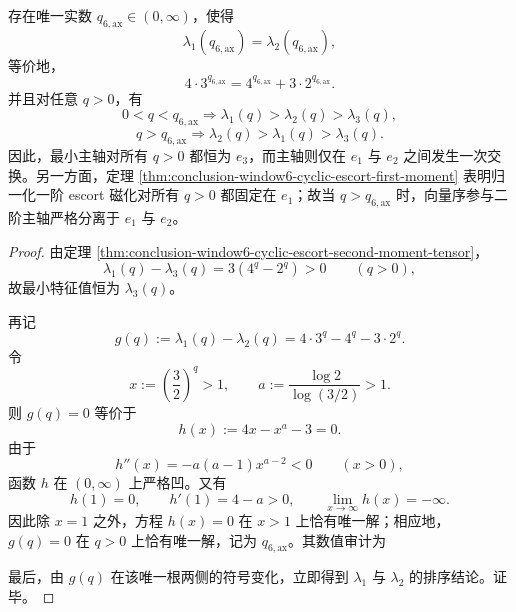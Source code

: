 \begin{corollary}\label{cor:conclusion-window6-cyclic-escort-axis-reordering}
存在唯一实数 \(q_{6,\mathrm{ax}}\in(0,\infty)\)，使得
\[
\lambda_1(q_{6,\mathrm{ax}})=\lambda_2(q_{6,\mathrm{ax}}),
\]
等价地，
\[
4\cdot 3^{q_{6,\mathrm{ax}}}=4^{q_{6,\mathrm{ax}}}+3\cdot 2^{q_{6,\mathrm{ax}}}.
\]
并且对任意 \(q>0\)，有
\[
0<q<q_{6,\mathrm{ax}}
\Longrightarrow
\lambda_1(q)>\lambda_2(q)>\lambda_3(q),
\]
\[
q>q_{6,\mathrm{ax}}
\Longrightarrow
\lambda_2(q)>\lambda_1(q)>\lambda_3(q).
\]
因此，最小主轴对所有 \(q>0\) 都恒为 \(e_3\)，而主轴则仅在 \(e_1\) 与 \(e_2\) 之间发生一次交换。另一方面，定理 \ref{thm:conclusion-window6-cyclic-escort-first-moment} 表明归一化一阶 escort 磁化对所有 \(q>0\) 都固定在 \(e_1\)；故当 \(q>q_{6,\mathrm{ax}}\) 时，向量序参与二阶主轴严格分离于 \(e_1\) 与 \(e_2\)。
\end{corollary}
\begin{proof}
由定理 \ref{thm:conclusion-window6-cyclic-escort-second-moment-tensor}，
\[
\lambda_1(q)-\lambda_3(q)=3(4^q-2^q)>0
\qquad(q>0),
\]
故最小特征值恒为 \(\lambda_3(q)\)。

再记
\[
g(q):=\lambda_1(q)-\lambda_2(q)=4\cdot 3^q-4^q-3\cdot 2^q.
\]
令
\[
x:=\left(\frac32\right)^q>1,
\qquad
a:=\frac{\log 2}{\log(3/2)}>1.
\]
则 \(g(q)=0\) 等价于
\[
h(x):=4x-x^a-3=0.
\]
由于
\[
h''(x)=-a(a-1)x^{a-2}<0
\qquad(x>0),
\]
函数 \(h\) 在 \((0,\infty)\) 上严格凹。又有
\[
h(1)=0,
\qquad
h'(1)=4-a>0,
\qquad
\lim_{x\to\infty}h(x)=-\infty.
\]
因此除 \(x=1\) 之外，方程 \(h(x)=0\) 在 \(x>1\) 上恰有唯一解；相应地，\(g(q)=0\) 在 \(q>0\) 上恰有唯一解，记为 \(q_{6,\mathrm{ax}}\)。其数值审计为


最后，由 \(g(q)\) 在该唯一根两侧的符号变化，立即得到 \(\lambda_1\) 与 \(\lambda_2\) 的排序结论。证毕。
\end{proof}

